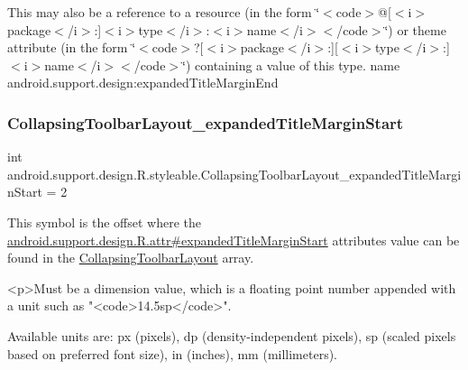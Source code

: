 This may also be a reference to a resource (in the form \char`\"{}$<$code$>$@\mbox{[}$<$i$>$package$<$/i$>$\+:\mbox{]}$<$i$>$type$<$/i$>$\+:$<$i$>$name$<$/i$>$$<$/code$>$\char`\"{}) or theme attribute (in the form \char`\"{}$<$code$>$?\mbox{[}$<$i$>$package$<$/i$>$\+:\mbox{]}\mbox{[}$<$i$>$type$<$/i$>$\+:\mbox{]}$<$i$>$name$<$/i$>$$<$/code$>$\char`\"{}) containing a value of this type.  name android.\+support.\+design\+:expanded\+Title\+Margin\+End \mbox{\label{classandroid_1_1support_1_1design_1_1R_1_1styleable_a0f562825d10f9717d8465bda7c24e1ad}} 
\subsubsection{\texorpdfstring{Collapsing\+Toolbar\+Layout\+\_\+expanded\+Title\+Margin\+Start}{CollapsingToolbarLayout\_expandedTitleMarginStart}}
{\footnotesize\ttfamily int android.\+support.\+design.\+R.\+styleable.\+Collapsing\+Toolbar\+Layout\+\_\+expanded\+Title\+Margin\+Start = 2\hspace{0.3cm}{\ttfamily [static]}}

This symbol is the offset where the \hyperlink{classandroid_1_1support_1_1design_1_1R_1_1attr_a2706209f152d7a23ca581cf160c8614b}{android.\+support.\+design.\+R.\+attr\#expanded\+Title\+Margin\+Start} attribute\textquotesingle{}s value can be found in the \hyperlink{classandroid_1_1support_1_1design_1_1R_1_1styleable_a4a019838b1c3daad84b4ffff397db335}{Collapsing\+Toolbar\+Layout} array.

\begin{DoxyVerb}      <p>Must be a dimension value, which is a floating point number appended with a unit such as "<code>14.5sp</code>".
\end{DoxyVerb}
 Available units are\+: px (pixels), dp (density-\/independent pixels), sp (scaled pixels based on preferred font size), in (inches), mm (millimeters). 

